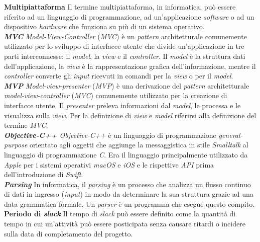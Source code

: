 \textbf{Multipiattaforma} Il termine multipiattaforma, in informatica, può essere riferito ad un linguaggio di programmazione, ad un'applicazione \textit{software} o ad un dispositivo \textit{hardware} che funziona su più di un sistema operativo.\\

\textbf{\textit{MVC}} \textit{Model-View-Controller} (\textit{MVC}) è un \textit{pattern} architetturale comunemente utilizzato per lo sviluppo di interfacce utente che divide un'applicazione in tre parti interconnesse: il \textit{model}, la \textit{view} e il \textit{controller}. Il \textit{model} è la struttura dati dell'applicazione, la \textit{view} è la rappresentazione grafica dell'informazione, mentre il \textit{controller} converte gli \textit{input} ricevuti in comandi per la \textit{view} o per il \textit{model}.\\

\textbf{\textit{MVP}} \textit{Model-view-presenter} (\textit{MVP}) è una derivazione del \textit{pattern} architetturale \textit{model-view-controller} (\textit{MVC}) comunemente utilizzato per la creazione di interfacce utente. Il \textit{presenter} preleva informazioni dal \textit{model}, le processa e le visualizza sulla \textit{view}. Per la definizione di \textit{view} e \textit{model} riferirsi alla definizione del termine \textit{MVC}. \\

\textbf{\textit{Objective-C++}} \textit{Objective-C++} è un linguaggio di programmazione \textit{general-purpose} orientato agli oggetti che aggiunge la messaggistica in stile \textit{Smalltalk} al linguaggio di programmazione \textit{C}. Era il linguaggio principalmente utilizzato da \textit{Apple} per i sistemi operativi \textit{macOS} e \textit{iOS} e le rispettive \textit{API} prima dell'introduzione di \textit{Swift}.\\

\textbf{\textit{Parsing}} In informatica, il \textit{parsing} è un processo che analizza un flusso continuo di dati in ingresso (\textit{input}) in modo da determinare la sua struttura grazie ad una data grammatica formale. Un \textit{parser} è un programma che esegue questo compito.\\

\textbf{Periodo di \textit{slack}} Il tempo di \textit{slack} può essere definito come la quantità di tempo in cui un'attività può essere posticipata senza causare ritardi o incidere sulla data di completamento del progetto.\\

